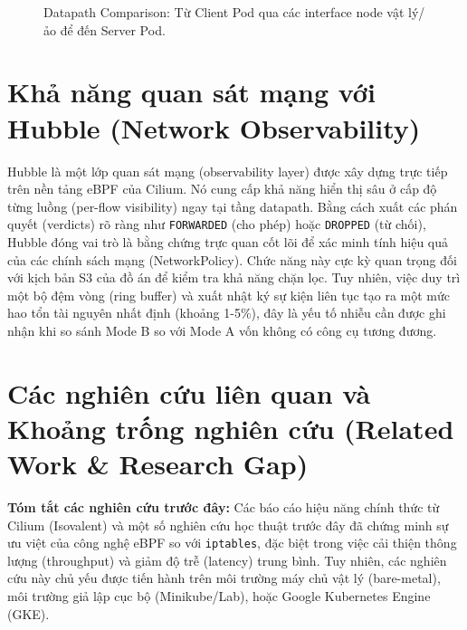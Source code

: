\begin{figure}[H]
{
}
\caption{Datapath Comparison: Từ Client Pod qua các interface node vật lý/ảo để đến Server Pod.}
\label{fig:datapath-comparison-detailed}
\end{figure}


\section{Khả năng quan sát mạng với Hubble (Network Observability)}
Hubble là một lớp quan sát mạng (observability layer) được xây dựng trực tiếp trên nền tảng eBPF của Cilium. Nó cung cấp khả năng hiển thị sâu ở cấp độ từng luồng (per-flow visibility) ngay tại tầng datapath. Bằng cách xuất các phán quyết (verdicts) rõ ràng như \texttt{FORWARDED} (cho phép) hoặc \texttt{DROPPED} (từ chối), Hubble đóng vai trò là bằng chứng trực quan cốt lõi để xác minh tính hiệu quả của các chính sách mạng (NetworkPolicy). Chức năng này cực kỳ quan trọng đối với kịch bản S3 của đồ án để kiểm tra khả năng chặn lọc. Tuy nhiên, việc duy trì một bộ đệm vòng (ring buffer) và xuất nhật ký sự kiện liên tục tạo ra một mức hao tổn tài nguyên nhất định (khoảng 1-5\%), đây là yếu tố nhiễu cần được ghi nhận khi so sánh Mode B so với Mode A vốn không có công cụ tương đương.

\section{Các nghiên cứu liên quan và Khoảng trống nghiên cứu (Related Work \& Research Gap)}

\textbf{Tóm tắt các nghiên cứu trước đây:} Các báo cáo hiệu năng chính thức từ Cilium (Isovalent) và một số nghiên cứu học thuật trước đây đã chứng minh sự ưu việt của công nghệ eBPF so với \texttt{iptables}, đặc biệt trong việc cải thiện thông lượng (throughput) và giảm độ trễ (latency) trung bình. Tuy nhiên, các nghiên cứu này chủ yếu được tiến hành trên môi trường máy chủ vật lý (bare-metal), môi trường giả lập cục bộ (Minikube/Lab), hoặc Google Kubernetes Engine (GKE).

